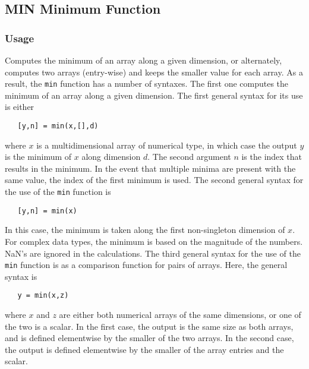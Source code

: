 %
%
%
\subsection{MIN Minimum Function}
\subsubsection{Usage}
Computes the minimum of an array along a given dimension, or alternately, 
computes two arrays (entry-wise) and keeps the smaller value for each array.
As a result, the \verb|min| function has a number of syntaxes.  The first
one computes the minimum of an array along a given dimension.
The first general syntax for its use is either
\begin{verbatim}
   [y,n] = min(x,[],d)
\end{verbatim}
where $x$ is a multidimensional array of numerical type, in which case the
output $y$ is the minimum of $x$ along dimension $d$.  
The second argument $n$ is the index that results in the minimum.
In the event that multiple minima are present with the same value,
the index of the first minimum is used. 
The second general syntax for the use of the \verb|min| function is
\begin{verbatim}
   [y,n] = min(x)
\end{verbatim} 
In this case, the minimum is taken along the first non-singleton 
dimension of $x$.  For complex data types,
the minimum is based on the magnitude of the numbers.  NaN's are
ignored in the calculations.
The third general syntax for the use of the \verb|min| function is as 
a comparison function for pairs of arrays.  Here, the general syntax is
\begin{verbatim}
   y = min(x,z)
\end{verbatim}
where $x$ and $z$ are either both numerical arrays of the same dimensions,
or one of the two is a scalar.  In the first case, the output is the 
same size as both arrays, and is defined elementwise by the smaller of the
two arrays.  In the second case, the output is defined elementwise by the 
smaller of the array entries and the scalar.

